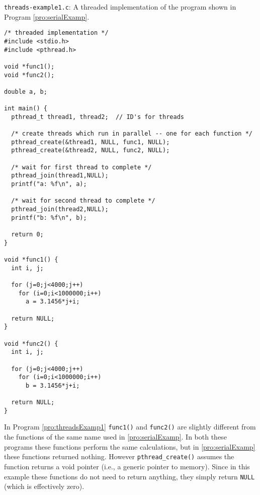 \begin{program}
{\tt threads-example1.c}: A threaded implementation of the program
shown in Program \ref{pro:serialExamp}.
\label{pro:threadsExamp1}
\codemiddle
\begin{lstlisting}
/* threaded implementation */
#include <stdio.h>
#include <pthread.h>

void *func1();
void *func2();

double a, b;

int main() {
  pthread_t thread1, thread2;  // ID's for threads

  /* create threads which run in parallel -- one for each function */
  pthread_create(&thread1, NULL, func1, NULL);
  pthread_create(&thread2, NULL, func2, NULL);

  /* wait for first thread to complete */
  pthread_join(thread1,NULL);
  printf("a: %f\n", a);

  /* wait for second thread to complete */
  pthread_join(thread2,NULL);
  printf("b: %f\n", b);

  return 0;
}

void *func1() {
  int i, j;

  for (j=0;j<4000;j++)
    for (i=0;i<1000000;i++)
      a = 3.1456*j+i;

  return NULL;
}
  
void *func2() {
  int i, j;

  for (j=0;j<4000;j++)
    for (i=0;i<1000000;i++)
      b = 3.1456*j+i;

  return NULL;
}
\end{lstlisting}
\end{program}

In Program \ref{pro:threadsExamp1} {\tt func1()} and {\tt func2()} are
slightly different from the functions of the same name used in
\ref{pro:serialExamp}.  In both these programs these functions
perform the same calculations, but in \ref{pro:serialExamp} these
functions returned nothing.  However {\tt pthread\_create()} assumes
the function returns a void pointer (i.e., a generic pointer to
memory).  Since in this example these functions do not need to return
anything, they simply return {\tt NULL} (which is effectively zero).

